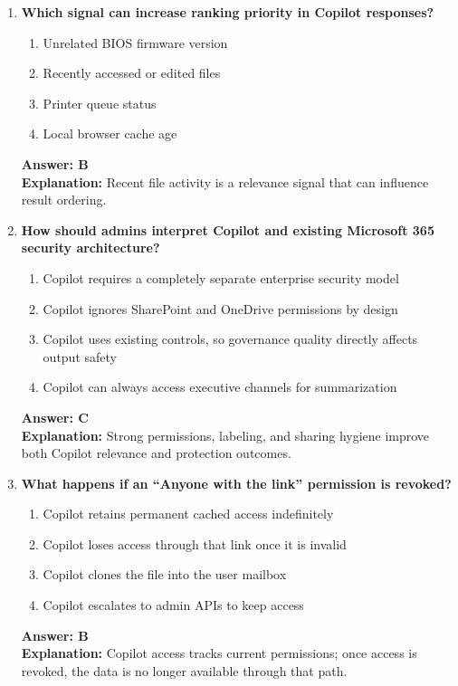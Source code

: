 \documentclass[10pt]{article}
\begin{document}
\begin{enumerate}[leftmargin=*]
\item \textbf{Which signal can increase ranking priority in Copilot responses?}
\begin{enumerate}[label=\Alph*.]
  \item Unrelated BIOS firmware version
  \item Recently accessed or edited files
  \item Printer queue status
  \item Local browser cache age
\end{enumerate}
\textbf{Answer: B}\\
\textbf{Explanation:} Recent file activity is a relevance signal that can influence result ordering.

\item \textbf{How should admins interpret Copilot and existing Microsoft 365 security architecture?}
\begin{enumerate}[label=\Alph*.]
  \item Copilot requires a completely separate enterprise security model
  \item Copilot ignores SharePoint and OneDrive permissions by design
  \item Copilot uses existing controls, so governance quality directly affects output safety
  \item Copilot can always access executive channels for summarization
\end{enumerate}
\textbf{Answer: C}\\
\textbf{Explanation:} Strong permissions, labeling, and sharing hygiene improve both Copilot relevance and protection outcomes.

\item \textbf{What happens if an ``Anyone with the link'' permission is revoked?}
\begin{enumerate}[label=\Alph*.]
  \item Copilot retains permanent cached access indefinitely
  \item Copilot loses access through that link once it is invalid
  \item Copilot clones the file into the user mailbox
  \item Copilot escalates to admin APIs to keep access
\end{enumerate}
\textbf{Answer: B}\\
\textbf{Explanation:} Copilot access tracks current permissions; once access is revoked, the data is no longer available through that path.


\end{enumerate}
\end{document}
